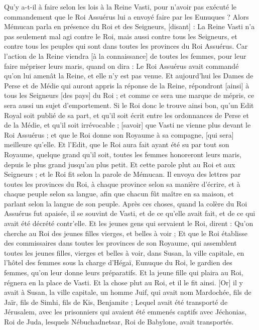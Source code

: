\begin{multicols}{2}
Qu'y a-t-il à faire selon les lois à la Reine Vasti, pour n'avoir pas exécuté le commandement que le Roi Assuérus lui a envoyé faire par les Eunuques ?
Alors Mémucan parla en présence du Roi et des Seigneurs, [disant] : La Reine Vasti n'a pas seulement mal agi contre le Roi, mais aussi contre tous les Seigneurs, et contre tous les peuples qui sont dans toutes les provinces du Roi Assuérus.
Car l'action de la Reine viendra [à la connaissance] de toutes les femmes, pour leur faire mépriser leurs maris, quand on dira : Le Roi Assuérus avait commandé qu'on lui amenât la Reine, et elle n'y est pas venue.
Et aujourd'hui les Dames de Perse et de Médie qui auront appris la réponse de la Reine, répondront [ainsi] à tous les Seigneurs [des pays] du Roi ; et comme ce sera une marque de mépris, ce sera aussi un sujet d'emportement.
Si le Roi donc le trouve ainsi bon, qu'un Edit Royal soit publié de sa part, et qu'il soit écrit entre les ordonnances de Perse et de la Médie, et qu'il soit irrévocable ; [savoir] que Vasti ne vienne plus devant le Roi Assuérus ; et que le Roi donne son Royaume à sa compagne, [qui sera] meilleure qu'elle.
Et l'Edit, que le Roi aura fait ayant été su par tout son Royaume, quelque grand qu'il soit, toutes les femmes honoreront leurs maris, depuis le plus grand jusqu'au plus petit.
Et cette parole plut au Roi et aux Seigneurs ; et le Roi fit selon la parole de Mémucan.
Il envoya des lettres par toutes les provinces du Roi, à chaque province selon sa manière d'écrire, et à chaque peuple selon sa langue, afin que chacun fût maître en sa maison, et parlant selon la langue de son peuple.
\VerseOne{}Après ces choses, quand la colère du Roi Assuérus fut apaisée, il se souvint de Vasti, et de ce qu'elle avait fait, et de ce qui avait été décrété contr'elle.
Et les jeunes gens qui servaient le Roi, dirent : Qu'on cherche au Roi des jeunes filles vierges, et belles à voir ;
Et que le Roi établisse des commissaires dans toutes les provinces de son Royaume, qui assemblent toutes les jeunes filles, vierges et belles à voir, dans Susan, la ville capitale, en l'hôtel des femmes sous la charge d'Hégaï, Eunuque du Roi, le gardien des femmes, qu'on leur donne leurs préparatifs.
Et la jeune fille qui plaira au Roi, régnera en la place de Vasti. Et la chose plut au Roi, et il le fit ainsi.
[Or] il y avait à Susan, la ville capitale, un homme Juif, qui avait nom Mardochée, fils de Jaïr, fils de Simhi, fils de Kis, Benjamite ;
Lequel avait été transporté de Jérusalem, avec les prisonniers qui avaient été emmenés captifs avec Jéchonias, Roi de Juda, lesquels Nébuchadnetsar, Roi de Babylone, avait transportés.

\end{multicols}
